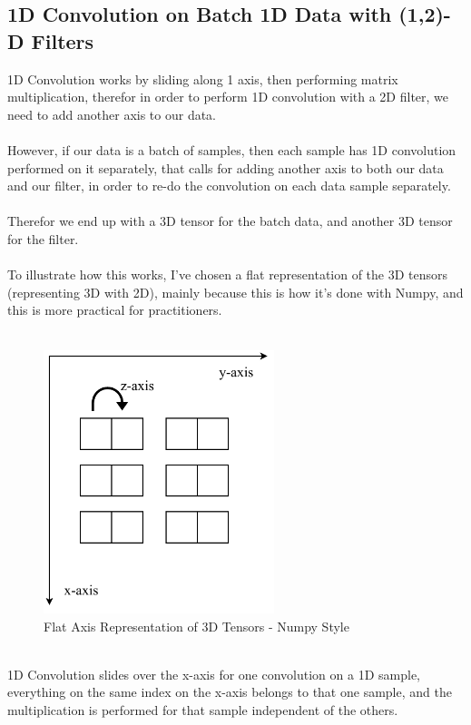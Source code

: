 \documentclass[12pt]{article}
\begin{document}
\subsection{\textbf{1D Convolution on Batch 1D Data with (1,2)-D Filters}}
1D Convolution works by sliding along 1 axis, then performing matrix multiplication, therefor in order to perform 1D convolution with a 2D filter, we need to add another axis to our data.\\\\
However, if our data is a batch of samples, then each sample has 1D convolution performed on it separately, that calls for adding another axis to both our data and our filter, in order to re-do the convolution on each data sample separately.\\\\
Therefor we end up with a 3D tensor for the batch data, and another 3D tensor for the filter.\\\\
To illustrate how this works, I've chosen a flat representation of the 3D tensors (representing 3D with 2D), mainly because this is how it's done with Numpy, and this is more practical for practitioners.\\\\
\begin{figure}[!htbp]
	\begin{center}
		\includegraphics[width=0.6\textwidth]{numpy-3Dtensor-axis}
		\caption{Flat Axis Representation of 3D Tensors - Numpy Style}
	\end{center}
\end{figure}\\
1D Convolution slides over the x-axis for one convolution on a 1D sample, everything on the same index on the x-axis belongs to that one sample, and the multiplication is performed for that sample independent of the others.\\\\
\end{document}
